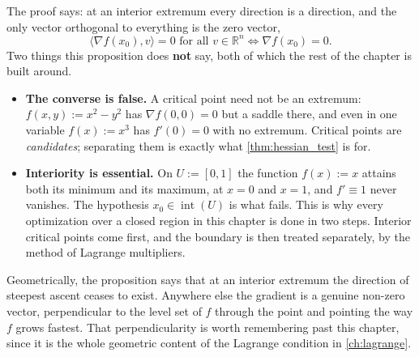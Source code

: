\begin{remark}
The proof says: at an interior extremum every direction is a  direction, and the only
vector orthogonal to everything is the zero vector,
\[\langle\nabla f(x_0), v\rangle = 0 \text{ for all } v \in \mathbb{R}^n
  \iff \nabla f(x_0) = 0.\]
Two things this proposition does \textbf{not} say, both of which the rest of the chapter is
built around.
\begin{itemize}
  \item \textbf{The converse is false.} A critical point need not be an extremum:
    $f(x,y) := x^2-y^2$ has $\nabla f(0,0)=0$ but a saddle there, and even in one variable
    $f(x) := x^3$ has $f'(0)=0$ with no extremum. Critical points are \emph{candidates};
    separating them is exactly what \cref{thm:hessian_test} is for.
  \item \textbf{Interiority is essential.} On $U := [0,1]$ the function $f(x) := x$ attains both
    its minimum and its maximum, at $x=0$ and $x=1$, and $f' \equiv 1$ never vanishes. The
    hypothesis $x_0 \in \operatorname{int}(U)$ is what fails. This is why every optimization over
    a closed region in this chapter is done in two steps. Interior critical points come first,
    and the boundary is then treated separately, by the method of Lagrange multipliers.
\end{itemize}
\end{remark}

Geometrically, the proposition says that at an interior extremum the direction of steepest ascent
ceases to exist. Anywhere else the gradient is a genuine non-zero vector, perpendicular to the
level set of $f$ through the point and pointing the way $f$ grows fastest. That perpendicularity
is worth remembering past this chapter, since it is the whole geometric content of the Lagrange
condition in \cref{ch:lagrange}.

